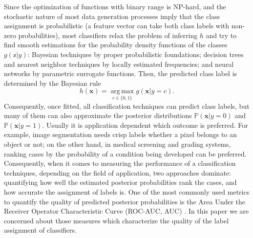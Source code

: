 \documentclass[5p, final]{elsarticle}
\DeclareMathOperator*{\argmax}{arg\,max}
\begin{document}
Since the optimization of functions with binary range is NP-hard, and the stochastic nature of most data generation processes imply that the class assignment is probabilistic (a feature vector can take both class labels with non-zero probabilities), most classifiers relax the problem of inferring $h$ and try to find smooth estimations for the probability density functions of the classes $g(\mathbb{x}|y)$: Bayesian techniques \cite{bayesiannetwork} by proper probabilistic foundations; decision trees \cite{mlbook} and nearest neighbor \cite{mlbook} techniques by locally estimated frequencies; and neural networks \cite{mlbook} by parametric surrogate functions. Then, the predicted class label is determined by the Bayesian rule
\begin{equation}
h(\mathbf{x}) = \argmax\limits_{c\in\lbrace 0, 1\rbrace} g(\mathbf{x}|y=c).
\end{equation}
Consequently, once fitted, all classification techniques can predict class labels, but many of them can also approximate the posterior distributions $\mathbb{P}(\mathbf{x}|y=0)$ and $\mathbb{P}(\mathbf{x}|y=1)$. Usually it is application dependent which outcome is preferred. For example, image segmentation needs crisp labels whether a pixel belongs to an object or not; on the other hand, in medical screening and grading systems, ranking cases by the probability of a condition being developed can be preferred. Consequently, when it comes to measuring the performance of a classification techniques, depending on the field of application, two approaches dominate: quantifying how well the estimated posterior probabilities rank the cases, and how accurate the assignment of labels is. One of the most commonly used metrics to quantify the quality of predicted posterior probabilities is the Area Under the Receiver Operator Characteristic Curve (ROC-AUC, AUC) \cite{auc}. In this paper we are concerned about those measures which characterize the quality of the label assignment of classifiers.
\end{document}
